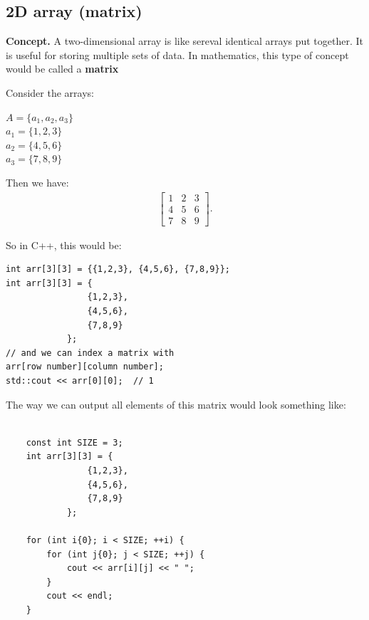 \documentclass{report}
\begin{document}
    \subsection{2D array (matrix)}
    \bigbreak \noindent 
    \textbf{Concept.} A two-dimensional array is like sereval identical arrays put together. It is useful for storing multiple sets of data. In mathematics, this type of concept would be called a \textbf{matrix}
    \bigbreak \noindent 
    \begin{minipage}[]{0.47\textwidth}
    Consider the arrays:
    \begin{center}
        $A = \{a_{1}, a_{2}, a_{3}\} $ \\
        $a_{1} = \{1,2,3\} $ \\
        $a_{2} = \{4,5,6\} $ \\
        $a_{3} = \{7,8,9\} $ \\
    \end{center}
    \end{minipage}
    \begin{minipage}[]{0.47\textwidth}
    Then we have:
    \begin{align*}
        \begin{bmatrix}
            1 & 2 & 3 \\
            4 & 5 & 6 \\
            7 & 8 & 9
        \end{bmatrix}
    .\end{align*}
    \end{minipage}
    \bigbreak \noindent 
    So in C++, this would be:
    \bigbreak \noindent 
    \sepline
    \begin{verbatim}
int arr[3][3] = {{1,2,3}, {4,5,6}, {7,8,9}};
int arr[3][3] = {
                {1,2,3},
                {4,5,6},
                {7,8,9}
            };
// and we can index a matrix with
arr[row number][column number];
std::cout << arr[0][0];  // 1
    \end{verbatim}
    \sepline
    \bigbreak \noindent 
    The way we can output all elements of this matrix would look something like:
    \bigbreak \noindent 
    \begin{minipage}[t]{0.47\textwidth}
    \bigbreak \noindent 
    \sepline
    \begin{verbatim}

    const int SIZE = 3;
    int arr[3][3] = {
                {1,2,3},
                {4,5,6},
                {7,8,9}
            };

    for (int i{0}; i < SIZE; ++i) {
        for (int j{0}; j < SIZE; ++j) {
            cout << arr[i][j] << " ";
        } 
        cout << endl;
    }
    \end{verbatim}
    \sepline
    \end{minipage}
\end{document}
